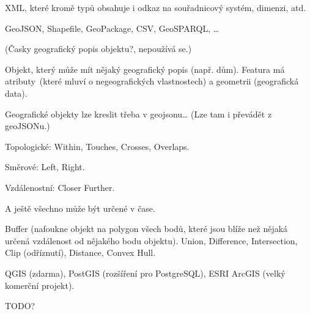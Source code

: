 \documentclass[12pt]{article}					%
\begin{document}
\begin{definice}
	XML, které kromě typů obsahuje i odkaz na souřadnicový systém, dimenzi, atd.
\end{definice}

\begin{definice}
	GeoJSON, Shapefile, GeoPackage, CSV, GeoSPARQL, …
\end{definice}

\begin{definice}[Feature]
	(Časky geografický popis objektu?, nepoužívá se.)

	Objekt, který může mít nějaký geografický popis (např. dům). Featura má atributy (které mluví o negeografických vlastnostech) a geometrii (geografická data).
\end{definice}

\begin{poznamka}
	Geografické objekty lze kreslit třeba v geojsonu… (Lze tam i převádět z geoJSONu.)
\end{poznamka}

\begin{definice}
	Topologické: Within, Touches, Crosses, Overlaps.

	Směrové: Left, Right.

	Vzdálenostní: Closer Further.

	A ještě všechno může být určené v čase.
\end{definice}

\begin{definice}
	Buffer (nafoukne objekt na polygon všech bodů, které jsou blíže než nějaká určená vzdálenost od nějakého bodu objektu). Union, Difference, Intersection, Clip (odříznutí), Distance, Convex Hull.
\end{definice}

\begin{definice}
	QGIS (zdarma), PostGIS (rozšíření pro PostgreSQL), ESRI ArcGIS (velký komerční projekt).
\end{definice}

TODO?
\end{document}
